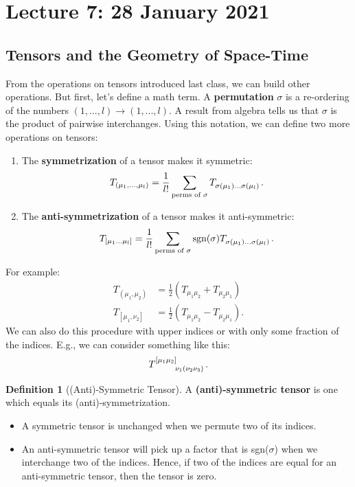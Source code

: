 \documentclass[11pt]{article}
\theoremstyle{definition}
\newtheorem{definition}{Definition}[section]
\begin{document}
\section{Lecture 7: 28 January 2021}
\subsection{Tensors and the Geometry of Space-Time}
From the operations on tensors introduced last class, we can build other operations. But first, let's define a math term. A \textbf{permutation} \( \sigma \) is a re-ordering of the numbers \( (1,..., l)  \rightarrow (1, ..., l ) \). A result from algebra tells us that \( \sigma \) is the product of pairwise interchanges. Using this notation, we can define two more operations on tensors: 
\begin{enumerate}[noitemsep]
	\item The \textbf{symmetrization} of a tensor makes it symmetric: 
	\begin{align*}
		T_{(\mu_1, ..., \mu_l)} = \frac{1}{l!} \sum_{\text{perms of } \sigma} \tensor{T}{_{\sigma(\mu_1) ... \sigma(\mu_l)}}. 
	\end{align*}
	\item The \textbf{anti-symmetrization} of a tensor makes it anti-symmetric: 
	\begin{align*}
		T_{[\mu_1 ... \mu_l]} = \frac{1}{l!} \sum_{\text{perms of } \sigma} \text{sgn}(\sigma) \tensor{T}{_{\sigma(\mu_1) ... \sigma(\mu_l)}}. 
	\end{align*}
\end{enumerate} 
For example: 
\begin{align*}
	T_{(\mu_1, \mu_2)} & = \frac{1}{2}( T_{\mu_1 \mu_2} + T_{\mu_2 \mu_1} ) \\
	T_{[\mu_1, \nu_2]} & = \frac{1}{2}( T_{\mu_1 \mu_2} - T_{\mu_2 \mu_1} ). 
\end{align*}
We can also do this procedure with upper indices or with only some fraction of the indices. E.g., we can consider something like this: 
\begin{align*}
	\tensor{T}{^{[\mu_1 \mu_2]}_{\nu_1 (\nu_2 \nu_3)}}. 
\end{align*}


\begin{definition}[(Anti)-Symmetric Tensor]\label{def:symmtens} 
	A \textbf{(anti)-symmetric tensor} is one which equals its (anti)-symmetrization. 
\end{definition}
\begin{itemize}[noitemsep]
	\item A symmetric tensor is unchanged when we permute two of its indices. 
	\item An anti-symmetric tensor will pick up a factor that is sgn(\(\sigma \)) when we interchange two of the indices. Hence, if two of the indices are equal for an anti-symmetric tensor, then the tensor is zero.
\end{itemize}
\end{document}
